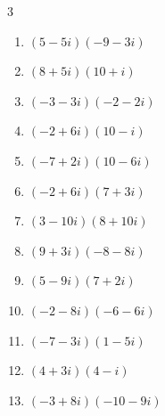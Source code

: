 \begin{multicols}{3}
\begin{enumerate}
  \item $\displaystyle (5-5i)(-9-3i)$

        \phantom{$\displaystyle =-60+30i$}

  \item $\displaystyle (8+5i)(10+i)$

        \phantom{$\displaystyle =75+58i$}

  \item $\displaystyle (-3-3i)(-2-2i)$

        \phantom{$\displaystyle =12i$}

  \item $\displaystyle (-2+6i)(10-i)$

        \phantom{$\displaystyle =-14+62i$}

  \item $\displaystyle (-7+2i)(10-6i)$

        \phantom{$\displaystyle =-58+62i$}

  \item $\displaystyle (-2+6i)(7+3i)$

        \phantom{$\displaystyle =-32+36i$}

  \item $\displaystyle (3-10i)(8+10i)$

        \phantom{$\displaystyle =124-50i$}

  \item $\displaystyle (9+3i)(-8-8i)$

        \phantom{$\displaystyle =-48-96i$}

  \item $\displaystyle (5-9i)(7+2i)$

        \phantom{$\displaystyle =53-53i$}

  \item $\displaystyle (-2-8i)(-6-6i)$

        \phantom{$\displaystyle =-36+60i$}

\columnbreak %

  \item $\displaystyle (-7-3i)(1-5i)$

        \phantom{$\displaystyle =-22+32i$}

  \item $\displaystyle (4+3i)(4-i)$

        \phantom{$\displaystyle =19+8i$}

  \item $\displaystyle (-3+8i)(-10-9i)$


\end{enumerate}
\end{multicols}

